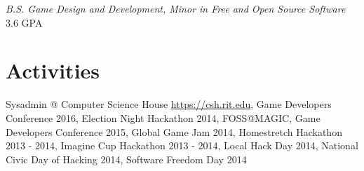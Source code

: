 \documentclass[line,margin]{res}
\begin{document}
\begin{resume}
{\sl B.S. Game Design and Development, Minor in Free and Open Source Software} \hfill 3.6 GPA

\section{Activities}
Sysadmin @ Computer Science House \url{https://csh.rit.edu}, Game Developers Conference
2016, Election Night Hackathon 2014, FOSS@MAGIC, Game Developers Conference 2015,
Global Game Jam 2014, Homestretch Hackathon 2013 - 2014, Imagine Cup Hackathon 2013 - 2014,
Local Hack Day 2014, National Civic Day of Hacking 2014, Software Freedom Day 2014



\end{resume}
\end{document}
